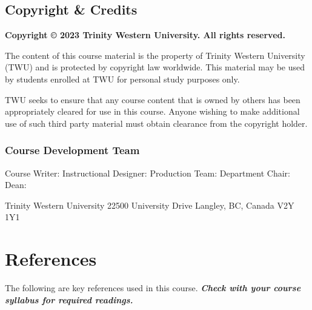 \documentclass[
]{book}
\begin{document}
\hypertarget{copyright-credits}{%
\section*{Copyright \& Credits}\label{copyright-credits}}

\textbf{Copyright © 2023 Trinity Western University. All rights reserved.}

The content of this course material is the property of Trinity Western University (TWU) and is protected by copyright law worldwide. This material may be used by students enrolled at TWU for personal study purposes only.

TWU seeks to ensure that any course content that is owned by others has been appropriately cleared for use in this course. Anyone wishing to make additional use of such third party material must obtain clearance from the copyright holder.

\hypertarget{course-development-team}{%
\subsection{Course Development Team}\label{course-development-team}}

Course Writer:
Instructional Designer:
Production Team:
Department Chair:
Dean:

Trinity Western University
22500 University Drive
Langley, BC, Canada \textbar{} V2Y 1Y1

\hypertarget{references}{%
\chapter*{References}\label{references}}

The following are key references used in this course. \textbf{\emph{Check with your course syllabus for required readings.}}

  
\end{document}
